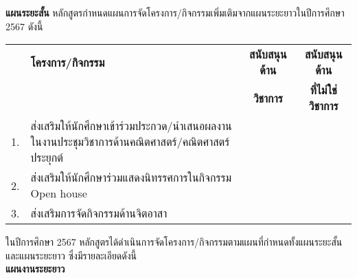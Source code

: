 \textbf{แผนระยะสั้น} หลักสูตรกำหนดแผนการจัดโครงการ/กิจกรรมเพิ่มเติมจากแผนระยะยาวในปีการศึกษา 2567  ดังนี้ 
\begin{longtable}{|c >{\raggedright}p{8.7cm}|c|c|}
	\hline
	&\centering\textbf{โครงการ/กิจกรรม}&\textbf{สนับสนุนด้าน}&\textbf{สนับสนุนด้าน}\\
&&\textbf{วิชาการ}&\textbf{ที่ไม่ใช่วิชาการ}\\\hline
	1.&ส่งเสริมให้นักศึกษาเข้าร่วมประกวด/นำเสนอผลงานในงานประชุมวิชาการด้านคณิตศาสตร์/คณิตศาสตร์ประยุกต์& \checkmark & \\\hline
	2.&ส่งเสริมให้นักศึกษาร่วมแสดงนิทรรศการในกิจกรรม Open house  &  \checkmark  &   \\\hline
	3.&ส่งเสริมการจัดกิจกรรมด้านจิตอาสา &    & \checkmark \\\hline
\end{longtable}	
\newpage
ในปีการศึกษา 2567 หลักสูตรได้ดำเนินการจัดโครงการ/กิจกรรมตามแผนที่กำหนดทั้งแผนระยะสั้นและแผนระยะยาว ซึ่งมีรายละเอียดดังนี้\\
\textbf{แผนงานระยะยาว}
